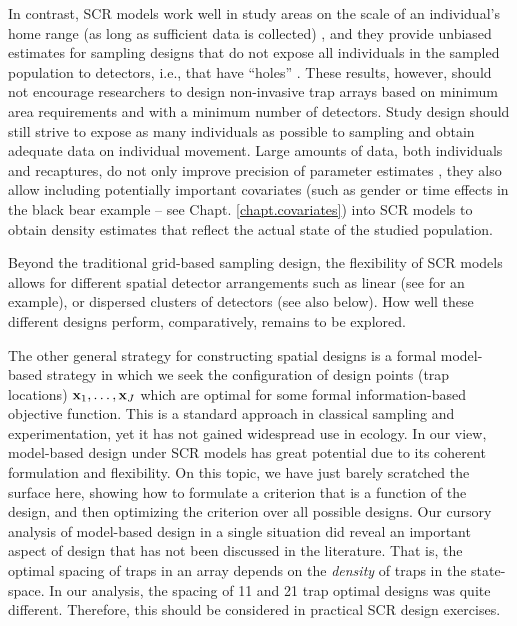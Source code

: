 In contrast, SCR models work well in study areas on the scale of an
individual's home range (as long as sufficient data is collected)
\citep{sollmann_etal:2012, efford_etal:2011, marques_etal:2011}, and
they provide unbiased estimates for sampling designs that do not
expose all individuals in the sampled population to detectors, i.e.,
that have ``holes'' \citep{efford_fewster:2012}.  These results,
however, should not encourage researchers to design non-invasive trap
arrays based on minimum area requirements and with a minimum number of
detectors. Study design should still strive to expose as many
individuals as possible to sampling and obtain adequate data on
individual movement. Large amounts of data, both individuals and
recaptures, do not only improve precision of parameter estimates
\citep{sollmann_etal:2012, efford_etal:2004}, they also allow
including potentially important covariates (such as gender or time
effects in the black bear example -- see
Chapt. \ref{chapt.covariates}) into SCR models to obtain density
estimates that reflect the actual state of the studied population.

Beyond the traditional grid-based sampling design, the flexibility of
SCR models allows for different spatial detector arrangements such as
linear (see \citet{efford_etal:2011} for an example), or dispersed
clusters of detectors (see also below). How well these different
designs perform, comparatively, remains to be explored.

The other general strategy for constructing spatial designs is a
formal model-based strategy in which we seek the configuration of
design points (trap locations) ${\bf x}_{1},\ldots, {\bf x}_{J}$ which
are optimal for some formal information-based objective function.
This is a standard approach in classical sampling and experimentation,
yet it has not gained widespread use in ecology. In our view,
model-based design under SCR models has great potential due to its
coherent formulation and flexibility.  On this topic, we have just
barely scratched the surface here, showing how to formulate a
criterion that is a function of the design, and then optimizing the
criterion over all possible designs.  Our cursory analysis of
model-based design in a single situation did reveal an important
aspect of design that has not been discussed in the literature. That
is, the optimal spacing of traps in an array depends on the {\it
  density} of traps in the state-space. In our analysis, the spacing
of 11 and 21 trap optimal designs was quite different.  Therefore,
this should be considered in practical SCR design exercises.


